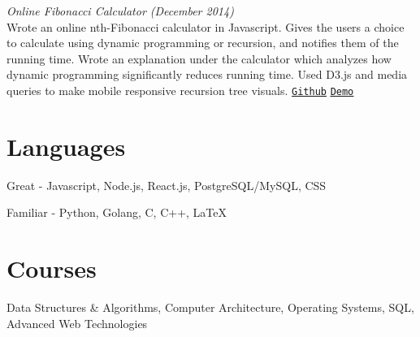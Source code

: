 \documentclass[margin]{res}
\begin{document}
\begin{resume}



\textit{Online Fibonacci Calculator (December 2014)}\\ Wrote an online nth-Fibonacci calculator in Javascript. Gives the users a choice to calculate using dynamic programming or recursion, and notifies them of the running time. Wrote an explanation under the calculator which analyzes how dynamic programming significantly reduces running time. Used D3.js and media queries to make mobile responsive recursion tree visuals. \underline{\texttt{\href{https://github.com/keithyong/fibonacci-calc}{Github}}} \underline{\texttt{\href{http://keithy.me/fibonacci-calc}{Demo}}}

\section{Languages}
Great - Javascript, Node.js, React.js, PostgreSQL/MySQL, CSS

Familiar - Python, Golang, C, C++, LaTeX

\section{Courses}
Data Structures \& Algorithms, Computer Architecture, Operating Systems, SQL, Advanced Web Technologies
\end{resume}
\end{document}
